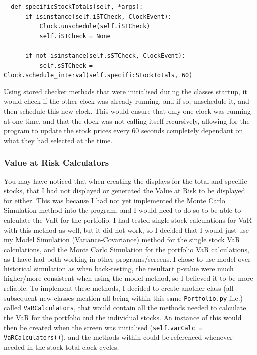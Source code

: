 \documentclass{article}
\begin{document}
\begin{verbatim}
  def specificStockTotals(self, *args):
      if isinstance(self.iSTCheck, ClockEvent):
          Clock.unschedule(self.iSTCheck)
          self.iSTCheck = None

      if not isinstance(self.sSTCheck, ClockEvent):
          self.sSTCheck = Clock.schedule_interval(self.specificStockTotals, 60)
\end{verbatim}

\vspace{0.3cm}
Using stored checker methods that were initialised during the classes startup, it would check if the other clock was already running, and if so, unschedule it, and then schedule this new clock. This would ensure that only one clock was running at one time, and that the clock was not calling itself recursively, allowing for the program to update the stock prices every 60 seconds completely dependant on what they had selected at the time.\\\vspace{0.3cm}

\subsubsection{Value at Risk Calculators}
You may have noticed that when creating the displays for the total and specific stocks, that I had not displayed or generated the Value at Risk to be displayed for either. This was because I had not yet implemented the Monte Carlo Simulation method into the program, and I would need to do so to be able to calculate the VaR for the portfolio. I had tested single stock calculations for VaR with this method as well, but it did not work, so I decided that I would just use my Model Simulation (Variance-Covariance) method for the single stock VaR calculations, and the Monte Carlo Simulation for the portfolio VaR calculations, as I have had both working in other programs/screens. I chose to use model over historical simulation as when back-testing, the resultant p-value were much higher/more consistent when using the model method, so I believed it to be more reliable. To implement these methods, I decided to create another class (all subsequent new classes mention all being within this same \texttt{Portfolio.py} file.) called \texttt{VaRCalculators}, that would contain all the methods needed to calculate the VaR for the portfolio and the individual stocks. An instance of this would then be created when the screen was initialised (\texttt{self.varCalc = VaRCalculators()}), and the methods within could be referenced  whenever needed in the stock total clock cycles.\\\vspace{0.3cm}
\end{document}
